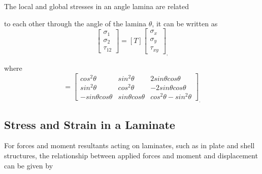 The local and global stresses in an angle lamina are related

to each other through the angle of the lamina $\theta $, it can be written as 
\begin{equation}
	\left[\begin{array}{l}\sigma _{1} \\ \sigma _{2} \\
	\tau_{12}\end{array}\right]=[T]\left[\begin{array}{l}\sigma _{x} \\ 
	\sigma _{y} \\\tau_{xy}\end{array}\right]_{\textstyle ,}
\end{equation}

where
\begin{equation}
	[T]=\left[\begin{array}{ccc}cos^{2}\theta & sin^{2}\theta & 2
		sin\theta cos\theta \\ 
sin^{2}\theta & cos^{2}\theta & -2 sin\theta cos\theta \\
-sin\theta cos\theta
			  & sin\theta cos\theta  &cos^{2}\theta -sin^{2}\theta
\end{array}\right]_{\textstyle .} 
\end{equation}



\subsection{Stress and Strain in a Laminate}
For forces and moment resultants acting on laminates, such as in plate and shell
structures, the relationship between applied forces and moment and displacement
can be given by

